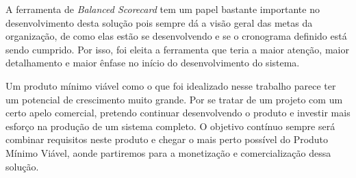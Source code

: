 \documentclass{abnt}
\begin{document}
A ferramenta de \textit{Balanced Scorecard} tem um papel bastante importante no
desenvolvimento desta solução pois sempre dá a visão geral das metas da
organização, de como elas estão se desenvolvendo e se o cronograma definido está
sendo cumprido. Por isso, foi eleita a ferramenta que teria a maior atenção,
maior detalhamento e maior ênfase no início do desenvolvimento do sistema.

Um produto mínimo viável como o que foi idealizado nesse trabalho parece ter um
potencial de crescimento muito grande. Por se tratar de um projeto com um certo
apelo comercial, pretendo continuar desenvolvendo o produto e investir mais
esforço na produção de um sistema completo. O objetivo contínuo sempre será
combinar requisitos neste produto e chegar o mais perto possível do Produto
Mínimo Viável, aonde partiremos para a monetização e comercialização dessa
solução.



\end{document}
